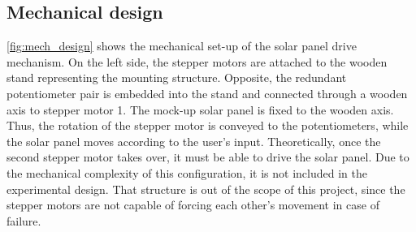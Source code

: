 \subsection{Mechanical design}
\autoref{fig:mech_design} shows the mechanical set-up of the solar panel drive mechanism. On the left side, the stepper motors are attached to the wooden stand representing the mounting structure. Opposite, the redundant potentiometer pair is embedded into the stand and connected through a wooden axis to stepper motor 1. The mock-up solar panel is fixed to the wooden axis. Thus, the rotation of the stepper motor is conveyed to the potentiometers, while the solar panel moves according to the user's input. Theoretically, once the second stepper motor takes over, it must be able to drive the solar panel. Due to the mechanical complexity of this configuration, it is not included in the experimental design. That structure is out of the scope of this project, since the stepper motors are not capable of forcing each other's movement in case of failure.



